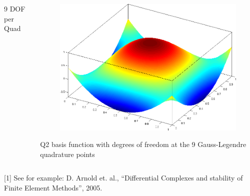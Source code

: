 \documentclass[8pt,xcolor=svgnames]{beamer}
\begin{document}
\begin{frame}
\begin{columns}
\begin{column}{0.3\textwidth}
{    9 DOF per Quad}
 \end{column}
 \begin{column}{0.3\textwidth}
  \begin{figure}[h!]
    \centering
    \includegraphics[width=1.0\textwidth,keepaspectratio=true]{./Images/Q2dBasis.png}
    \end{figure}
    \centering
    \small{Q2 basis function with degrees of freedom at the 9 Gauss-Legendre quadrature points}
 \end{column}
\end{columns}
\tiny{[1] See for example: D. Arnold et. al., “Differential Complexes and stability of Finite Element Methods”, 2005.}
\end{frame}
\end{document}
